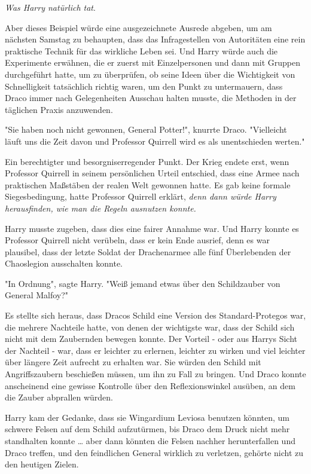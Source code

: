 {\emph{Was Harry natürlich tat}.

Aber dieses Beispiel würde eine ausgezeichnete Ausrede abgeben, um am nächsten Samstag zu behaupten, dass das Infragestellen von Autoritäten eine rein praktische Technik für das wirkliche Leben sei. Und Harry würde auch die Experimente erwähnen, die er zuerst mit Einzelpersonen und dann mit Gruppen durchgeführt hatte, um zu überprüfen, ob seine Ideen über die Wichtigkeit von Schnelligkeit tatsächlich richtig waren, um den Punkt zu untermauern, dass Draco immer nach Gelegenheiten Ausschau halten musste, die Methoden in der täglichen Praxis anzuwenden.

"Sie haben noch nicht gewonnen, General Potter!", knurrte Draco. "Vielleicht läuft uns die Zeit davon und Professor Quirrell wird es als unentschieden werten."

Ein berechtigter und besorgniserregender Punkt. Der Krieg endete erst, wenn Professor Quirrell in seinem persönlichen Urteil entschied, dass eine Armee nach praktischen Maßstäben der realen Welt gewonnen hatte. Es gab keine formale Siegesbedingung, hatte Professor Quirrell erklärt, \emph{denn dann würde Harry herausfinden, wie man die Regeln ausnutzen konnte.}

Harry musste zugeben, dass dies eine fairer Annahme war. Und Harry konnte es Professor Quirrell nicht verübeln, dass er kein Ende ausrief, denn es war plausibel, dass der letzte Soldat der Drachenarmee alle fünf Überlebenden der Chaoslegion ausschalten konnte.

"In Ordnung", sagte Harry. "Weiß jemand etwas über den Schildzauber von General Malfoy?"

Es stellte sich heraus, dass Dracos Schild eine Version des Standard-Protegos war, die mehrere Nachteile hatte, von denen der wichtigste war, dass der Schild sich nicht mit dem Zaubernden bewegen konnte. Der Vorteil - oder aus Harrys Sicht der Nachteil - war, dass er leichter zu erlernen, leichter zu wirken und viel leichter über längere Zeit aufrecht zu erhalten war. Sie würden den Schild mit Angriffszaubern beschießen müssen, um ihn zu Fall zu bringen. Und Draco konnte anscheinend eine gewisse Kontrolle über den Reflexionswinkel ausüben, an dem die Zauber abprallen würden.

Harry kam der Gedanke, dass sie Wingardium Leviosa benutzen könnten, um schwere Felsen auf dem Schild aufzutürmen, bis Draco dem Druck nicht mehr standhalten konnte … aber dann könnten die Felsen nachher herunterfallen und Draco treffen, und den feindlichen General wirklich zu verletzen, gehörte nicht zu den heutigen Zielen.

}
